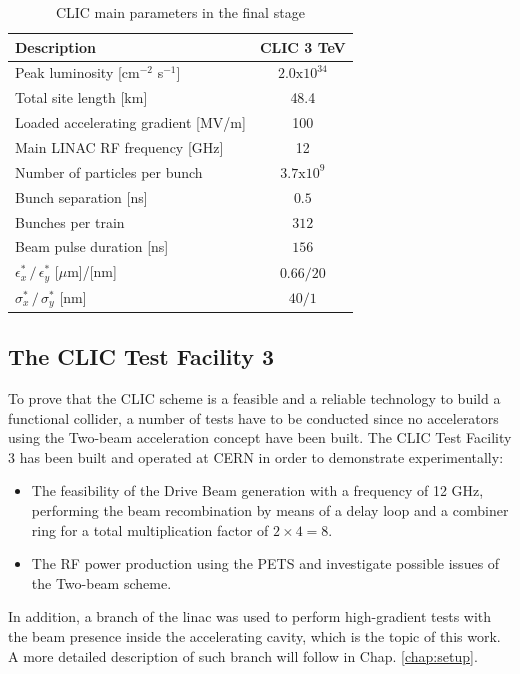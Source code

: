 \begin{table}[h]
  \centering
    \begin{tabular}{ l c  }
    \toprule
    \textbf{Description}						& \textbf{CLIC 3 TeV}	\\
    \midrule
    Peak luminosity [cm$^{-2}$ s$^{-1}$]			& $2.0\text{x}10^{34}$	\\
    Total site length [km]						& 48.4				\\
    Loaded accelerating gradient [MV/m]			& 100	\\
    Main LINAC RF frequency	[GHz]			& 12	\\
    Number of particles per bunch				& $3.7\text{x}10^{9}$ \\
    Bunch separation [ns]						& $0.5$ \\
    Bunches per train							& $312$ \\
    Beam pulse duration [ns]					& $156$ \\
    $\epsilon^*_x \, / \, \epsilon^*_y$ [$\mu$m]/[nm]	& $0.66/20$ \\  
    $\sigma^*_x\, / \, \sigma^*_y$ [nm]			& $40/1$	\\
    \bottomrule
    \end{tabular}
  \caption{CLIC main parameters in the final stage}
\label{table_CLIC_params}
\end{table}







\subsection[CTF3]{The CLIC Test Facility 3}

To prove that the CLIC scheme is a feasible and a reliable technology to build a functional collider, a number of tests have to be conducted since no accelerators using the Two-beam acceleration concept have been built. The CLIC Test Facility 3 has been built and operated at CERN in order to demonstrate experimentally:

\begin{itemize}
\item The feasibility of the Drive Beam generation with a frequency of 12 GHz, performing the beam recombination by means of  a delay loop and a combiner ring for a total multiplication factor of $2\times4 =8$.
\item The RF power production using the PETS and investigate possible issues of the Two-beam scheme.
\end{itemize}
In addition, a branch of the linac was used to perform high-gradient tests with the beam presence inside the accelerating cavity, which is the topic of this work. A more detailed description of such branch will follow in Chap. \ref{chap:setup}.
